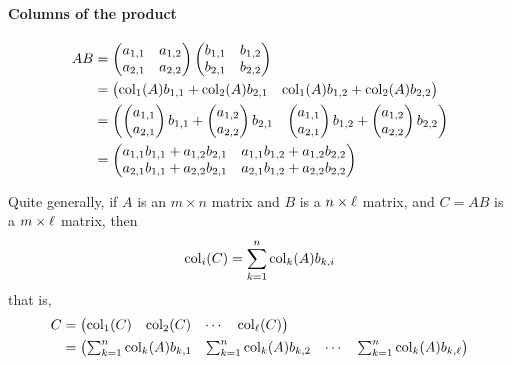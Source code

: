 \documentclass{ximera}
\begin{document}
\paragraph{Columns of the product}
\begin{align*}AB &= \begin{pmatrix}
a_{1,1} & a_{1,2}\\
a_{2,1} & a_{2,2}
\end{pmatrix}
\begin{pmatrix}
b_{1,1} & b_{1,2}\\
b_{2,1} & b_{2,2}
\end{pmatrix}\\
&= \begin{pmatrix}
\operatorname{col}_1(A)b_{1,1} + \operatorname{col}_2(A) b_{2,1} & \operatorname{col}_1(A)b_{1,2} + \operatorname{col}_2(A) b_{2,2}
\end{pmatrix}\\
&= \begin{pmatrix}
\begin{pmatrix}a_{1,1} \\ a_{2,1}\end{pmatrix}b_{1,1} + \begin{pmatrix}a_{1,2} \\ a_{2,2}\end{pmatrix}b_{2,1} & \begin{pmatrix}a_{1,1} \\ a_{2,1}\end{pmatrix}b_{1,2} + \begin{pmatrix}a_{1,2} \\ a_{2,2}\end{pmatrix}b_{2,2}
\end{pmatrix}\\
&= \begin{pmatrix}
a_{1,1}b_{1,1} + a_{1,2}b_{2,1} & a_{1,1}b_{1,2}+ a_{1,2}b_{2,2}\\
a_{2,1}b_{1,1} + a_{2,2}b_{2,1} & a_{2,1}b_{1,2} + a_{2,2}b_{2,2}
\end{pmatrix}
\end{align*}

Quite generally, if $A$ is an $m\times n$ matrix and $B$ is a $n\times
\ell$ matrix, and $C = AB$ is a $m\times \ell$ matrix, then
\[
\operatorname{col}_i(C) = \sum_{k=1}^n \operatorname{col}_k(A)b_{k,i}
\]
that is,
\begin{align*}
  C &= \begin{pmatrix} \operatorname{col}_1(C) & \operatorname{col}_2 (C) & \cdots & \operatorname{col}_{\ell}(C) \end{pmatrix}\\
  &=  \begin{pmatrix} \sum_{k=1}^n \operatorname{col}_k(A)b_{k,1} & \sum_{k=1}^n \operatorname{col}_k(A)b_{k,2} & \cdots & \sum_{k=1}^n \operatorname{col}_k(A)b_{k,\ell}\end{pmatrix}
\end{align*}
\end{document}
